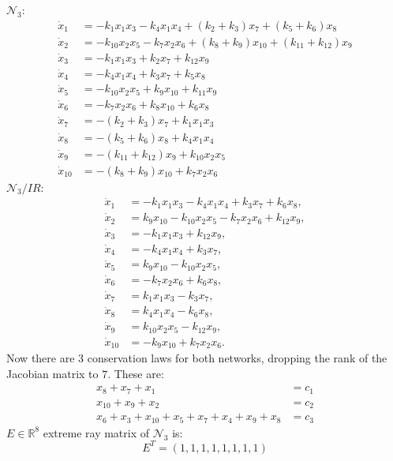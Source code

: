 $\mathcal{N}_3$:
\[
	\begin{aligned}
		\dot{x}_1&=-k_{1}x_{1}x_{3}-k_{4}x_{1}x_{4}+(k_{2}+k_{3})x_{7}+(k_{5}+k_{6})x_{8}\\\dot{x}_2&=-k_{10}x_{2}x_{5}-k_{7}x_{2}x_{6}+(k_{8}+k_{9})x_{10}+(k_{11}+k_{12})x_{9}\\\dot{x}_3&=-k_1x_1x_3+k_2x_7+k_{12}x_9\\\dot{x}_4&=-k_4x_1x_4+k_3x_7+k_5x_8\\\dot{x}_5&=-k_{10}x_2x_5+k_9x_{10}+k_{11}x_9\\\dot{x}_6&=-k_7x_2x_6+k_8x_{10}+k_6x_8\\\dot{x}_7&=-(k_2+k_3)x_7+k_1x_1x_3\\\dot{x}_8&=-(k_5+k_6)x_8+k_4x_1x_4\\\dot{x}_9&=-(k_{11}+k_{12})x_9+k_{10}x_2x_5\\\dot{x}_{10}&=-(k_8+k_9)x_{10}+k_7x_2x_6
	\end{aligned}
\]
$\mathcal{N}_3 / IR$:
\[
	\begin{aligned}
		\dot{x}_{1} &= -k_{1} x_{1} x_{3} - k_{4} x_{1} x_{4} + k_{3} x_{7} + k_{6} x_{8},\\
		\dot{x}_{2} &= k_{9} x_{10} - k_{10} x_{2} x_{5} - k_{7} x_{2} x_{6} + k_{12} x_{9},\\
		\dot{x}_{3} &= -k_{1} x_{1} x_{3} + k_{12} x_{9},\\
		\dot{x}_{4} &= -k_{4} x_{1} x_{4} + k_{3} x_{7},\\
		\dot{x}_{5} &= k_{9} x_{10} - k_{10} x_{2} x_{5},\\
		\dot{x}_{6} &= -k_{7} x_{2} x_{6} + k_{6} x_{8},\\
		\dot{x}_{7} &= k_{1} x_{1} x_{3} - k_{3} x_{7},\\
		\dot{x}_{8} &= k_{4} x_{1} x_{4} - k_{6} x_{8},\\
		\dot{x}_{9} &= k_{10} x_{2} x_{5} - k_{12} x_{9},\\
		\dot{x}_{10} &= -k_{9} x_{10} + k_{7} x_{2} x_{6}.
	\end{aligned}
\]
Now there are 3 conservation laws for both networks, dropping the rank of the Jacobian matrix to $7$. These are:
\[
	\begin{aligned}
		x_{8}+x_{7}+x_{1} &=c_{1}\\
		x_{10}+x_{9}+x_{2}&=c_{2}\\
		x_6 + x_3 + x_{ 10 } + x_5 + x_7 + x_4 + x_9 + x_8 &= c_3
	\end{aligned}
\]
$E \in \mathbb{R}^8$ extreme ray matrix of $\mathcal{N}_3$ is:
\begin{equation}\label{e_matix_net3}
	E^T=(1,1,1,1,1,1,1,1)
\end{equation}
